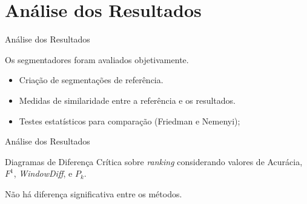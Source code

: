 \documentclass[xcolor=dvipsnames]{beamer}
\begin{document}
 
 
\section{Análise dos Resultados}
\begin{frame}{Análise dos Resultados}

	Os segmentadores foram avaliados objetivamente. 

\begin{itemize}
	\item Criação de segmentações de referência.
	\item Medidas de similaridade entre a referência e os resultados.
	\item Testes estatísticos para comparação (Friedman e Nemenyi);
\end{itemize}

\end{frame}



\begin{frame}{Análise dos Resultados}

\small\center Diagramas de Diferença Crítica sobre \textit{ranking} considerando valores de Acurácia, $F^1$, \textit{WindowDiff}, e $P_k$.

\begin{figure}[!h]
	\centering     %
\tiny


	
\end{figure}
Não há diferença significativa entre os métodos.
	
\end{frame}
	
\end{document}
